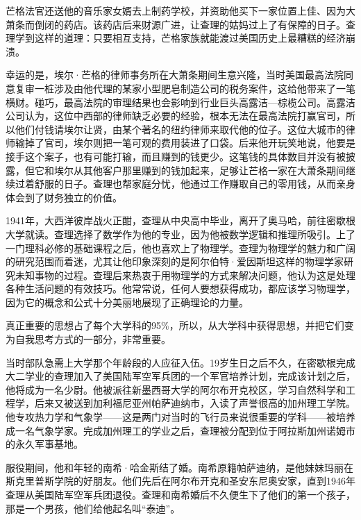 芒格法官还送他的音乐家女婿去上制药学校，并资助他买下一家位置上佳、因为大萧条而倒闭的药店。该药店后来财源广进，让查理的姑妈过上了有保障的日子。查理学到这样的道理：只要相互支持，芒格家族就能渡过美国历史上最糟糕的经济崩溃。
\par

幸运的是，埃尔·芒格的律师事务所在大萧条期间生意兴隆，当时美国最高法院同意复审一桩涉及由他代理的某家小型肥皂制造公司的税务案件，这给他带来了一笔横财。碰巧，最高法院的审理结果也会影响到行业巨头高露洁—棕榄公司。高露洁公司认为，这位中西部的律师缺乏必要的经验，根本无法在最高法院打赢官司，所以他们付钱请埃尔让贤，由某个著名的纽约律师来取代他的位子。这位大城市的律师输掉了官司，埃尔则把一笔可观的费用装进了口袋。后来他开玩笑地说，他要是接手这个案子，也有可能打输，而且赚到的钱更少。这笔钱的具体数目并没有被披露，但它和埃尔从其他客户那里赚到的钱加起来，足够让芒格一家在大萧条期间继续过着舒服的日子。查理也帮家庭分忧，他通过工作赚取自己的零用钱，从而亲身体会到了财务独立的价值。
\par

1941年，大西洋彼岸战火正酣，查理从中央高中毕业，离开了奥马哈，前往密歇根大学就读。查理选择了数学作为他的专业，因为他被数学逻辑和推理所吸引。上了一门理科必修的基础课程之后，他也喜欢上了物理学。查理为物理学的魅力和广阔的研究范围而着迷，尤其让他印象深刻的是阿尔伯特·爱因斯坦这样的物理学家研究未知事物的过程。查理后来热衷于用物理学的方式来解决问题，他认为这是处理各种生活问题的有效技巧。他常常说，任何人要想获得成功，都应该学习物理学，因为它的概念和公式十分美丽地展现了正确理论的力量。
\par

\begin{WisdomBox}
\par

真正重要的思想占了每个大学科的95\%，所以，从大学科中获得思想，并把它们变为自我思考方式的一部分，非常重要。
\par
\end{WisdomBox}

当时部队急需上大学那个年龄段的人应征入伍。19岁生日之后不久，在密歇根完成大二学业的查理加入了美国陆军空军兵团的一个军官培养计划，完成该计划之后，他将成为一名少尉。他被派往新墨西哥大学的阿尔布开克校区，学习自然科学和工程学，后来又被送到加利福尼亚州帕萨迪纳市，入读了声誉很高的加州理工学院。他专攻热力学和气象学——这是两门对当时的飞行员来说很重要的学科——被培养成一名气象学家。完成加州理工的学业之后，查理被分配到位于阿拉斯加州诺姆市的永久军事基地。
\par

服役期间，他和年轻的南希·哈金斯结了婚。南希原籍帕萨迪纳，是他妹妹玛丽在斯克里普斯学院的好朋友。他们先后在阿尔布开克和圣安东尼奥安家，直到1946年查理从美国陆军空军兵团退役。查理和南希婚后不久便生下了他们的第一个孩子，那是一个男孩，他们给他起名叫“泰迪”。
\par

